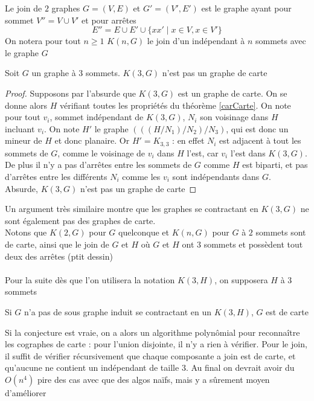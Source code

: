 \documentclass{scrartcl}
\begin{document}
\begin{flushleft}
\begin{def*}[Join]
    Le join de $2$ graphes $G = (V, E)$ et $G' = (V', E')$ est le graphe ayant pour sommet $V'' = V \cup V'$ et pour arrêtes
    \[ E'' = E \cup E' \cup \{ xx' \mid x \in V, x \in V' \} \]
    On notera pour tout $n \geq 1$ $K(n, G)$ le join d'un indépendant à $n$ sommets avec le graphe $G$
\end{def*}

\begin{prop}
    Soit $G$ un graphe à $3$ sommets. $K(3, G)$ n'est pas un graphe de carte
\end{prop}

\begin{proof}
    Supposons par l'absurde que $K(3, G)$ est un graphe de carte. On se donne alors $H$ vérifiant toutes les propriétés
    du théorème \ref{carCarte}. On note pour tout $v_i$, sommet indépendant de $K(3, G)$, $N_i$ son voisinage dans $H$
    incluant $v_i$. On note $H'$ le graphe $(((H / N_1) / N_2) / N_3)$, qui est donc un mineur de $H$ et donc planaire.
    Or $H' = K_{3,3}$ : en effet $N_i$ est adjacent à tout les sommets de $G$, comme le voisinage de $v_i$ dans $H$ l'est,
    car $v_i$ l'est dans $K(3, G)$. De plus il n'y a pas d'arrêtes entre les sommets de $G$ comme $H$ est biparti, et pas
    d'arrêtes entre les différents $N_i$ comme les $v_i$ sont indépendants dans $G$.\\
    Absurde, $K(3, G)$ n'est pas un graphe de carte
\end{proof}

Un argument très similaire montre que les graphes se contractant en $K(3, G)$ ne sont également pas des graphes de carte.\\
Notons que $K(2, G)$ pour $G$ quelconque et $K(n, G)$ pour $G$ à $2$ sommets sont de carte, ainsi que le join de $G$ et $H$ où
$G$ et $H$ ont $3$ sommets et possèdent tout deux des arrêtes (ptit dessin)
\\~\\
Pour la suite dès que l'on utilisera la notation $K(3, H)$, on supposera $H$ à $3$ sommets
\begin{conj}
    Si $G$ n'a pas de sous graphe induit se contractant en un $K(3, H)$, $G$ est de carte
\end{conj}

Si la conjecture est vraie, on a alors un algorithme polynômial pour reconnaître les cographes de carte : pour l'union disjointe,
il n'y a rien à vérifier. Pour le join, il suffit de vérifier récursivement que chaque composante a join est de carte, et
qu'aucune ne contient un indépendant de taille $3$. Au final on devrait avoir du $O(n^4)$ pire des cas avec que des algos
naïfs, mais y a sûrement moyen d'améliorer


\end{flushleft}
\end{document}
